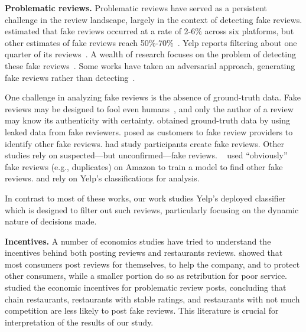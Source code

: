 \textbf{Problematic reviews.} Problematic reviews have served as a persistent challenge in the review landscape, largely in the context of detecting fake reviews. \citet{ott2012estimating} estimated that fake reviews occurred at a rate of 2-6\% across six platforms, but other estimates of fake reviews reach 50\%-70\%~\cite{dwoskin2018merchants,elliott2018trust}. Yelp reports filtering about one quarter of its reviews~\cite{yelp2010recommend}. A wealth of research focuses on the problem of detecting these fake reviews~\cite{jindal2008opinion,martens2019towards,ye2016temporal,shehnepoor2017netspam,kumar2018rev2,harris2012detecting,mukherjee2013yelp}. Some works have taken an adversarial approach, generating fake reviews rather than detecting~\cite{adelani2020generating,juuti2018stay,yao2017automated}.

One challenge in analyzing fake reviews is the absence of ground-truth data. Fake reviews may be designed to fool even humans~\cite{ott2011finding}, and only the author of a review may know its authenticity with certainty. \citet{wang2016real} obtained ground-truth data by using leaked data from fake reviewers. \citet{martens2019towards} posed as customers to fake review providers to identify other fake reviews. \citet{ott2011finding} had study participants create fake reviews. Other studies rely on suspected---but unconfirmed---fake reviews. ~\citet{jindal2008opinion} used ``obviously'' fake reviews (e.g., duplicates) on Amazon to train a model to find other fake reviews. \citet{mukherjee2013yelp} and \citet{rayana2015collective} rely on Yelp's classifications for analysis.%

In contrast to most of these works, our work studies Yelp's deployed classifier which is designed to filter out such reviews, particularly focusing on the dynamic nature of decisions made.%

\textbf{Incentives.} A number of economics studies have tried to understand the incentives behind both posting reviews and restaurants reviews. \citet{yoo2008motivates} showed that most consumers post reviews for themselves, to help the company, and to protect other consumers, while a smaller portion do so as retribution for poor service. \citet{luca2016fake} studied the economic incentives for problematic review posts, concluding that chain restaurants, restaurants with stable ratings, and restaurants with not much competition are less likely to post fake reviews. This literature is crucial for interpretation of the results of our study.

